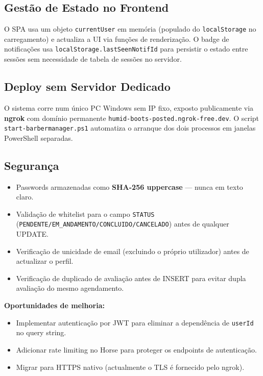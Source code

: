 \documentclass[12pt,a4paper]{article}
\begin{document}
\subsection{Gestão de Estado no Frontend}

O SPA usa um objeto \texttt{currentUser} em memória (populado do \texttt{localStorage} no carregamento) e actualiza a UI via funções de renderização. O badge de notificações usa \texttt{localStorage.lastSeenNotifId} para persistir o estado entre sessões sem necessidade de tabela de sessões no servidor.

\subsection{Deploy sem Servidor Dedicado}

O sistema corre num único PC Windows sem IP fixo, exposto publicamente via \textbf{ngrok} com domínio permanente \texttt{humid-boots-posted.ngrok-free.dev}. O script \texttt{start-barbermanager.ps1} automatiza o arranque dos dois processos em janelas PowerShell separadas.

\subsection{Segurança}

\begin{itemize}
  \item Passwords armazenadas como \textbf{SHA-256 uppercase} — nunca em texto claro.
  \item Validação de whitelist para o campo \texttt{STATUS} (\texttt{PENDENTE/EM\_ANDAMENTO/CONCLUIDO/CANCELADO}) antes de qualquer UPDATE.
  \item Verificação de unicidade de email (excluindo o próprio utilizador) antes de actualizar o perfil.
  \item Verificação de duplicado de avaliação antes de INSERT para evitar dupla avaliação do mesmo agendamento.
\end{itemize}

\textbf{Oportunidades de melhoria:}
\begin{itemize}
  \item Implementar autenticação por JWT para eliminar a dependência de \texttt{userId} no query string.
  \item Adicionar rate limiting no Horse para proteger os endpoints de autenticação.
  \item Migrar para HTTPS nativo (actualmente o TLS é fornecido pelo ngrok).
\end{itemize}
\end{document}
